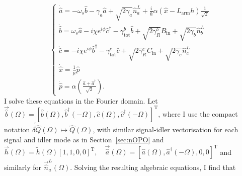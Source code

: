 \begin{equation}\label{eq:nIS_EoM}
\begin{cases}
\dot{\hat{a}}=-\omega_s\hat{b} - \gamma_a \hat{a} + \sqrt{2\gamma_a}\hat{n}^L_a+\frac{i}{\hbar}\alpha(\hat{x}-L_\mathrm{arm}h)\frac{1}{\sqrt{2}}\\
\dot{\hat{b}}=\omega_s\hat{a} - i\chi e^{i\phi}\hat{c}^\dagger - \gamma^b_\mathrm{tot} \hat{b} + \sqrt{2\gamma^b_R}\hat{B}_\mathrm{in} + \sqrt{2\gamma_b}\hat{n}^L_b\\
\dot{\hat{c}}=-i\chi e^{i\phi}\hat{b}^\dagger - \gamma^c_\mathrm{tot} \hat{c} + \sqrt{2\gamma^c_R}\hat{C}_\mathrm{in} + \sqrt{2\gamma_c}\hat{n}^L_c\\
\dot{\hat{x}}=\frac{1}{\mu}\hat{p}\\
\dot{\hat{p}}=\alpha\left(\frac{\hat{a}+\hat{a}^\dag}{\sqrt{2}}\right).
\end{cases}
\end{equation}
I solve these equations in the Fourier domain. Let $\vec{\hat b}(\Omega)=[\hat b(\Omega), \hat b^\dag(-\Omega), \hat c(\Omega), \hat c^\dag(-\Omega)]^\text{T}$, where I use the compact notation $\tilde{\delta\hat{Q}}(\Omega)\mapsto\hat{Q}(\Omega)$, with similar signal-idler vectorisation for each signal and idler mode as in Section~\ref{sec:nOPO} and $\vec h(\Omega)=\tilde h(\Omega) [1,1,0,0]^\text{T},\quad \vec{\hat a}(\Omega)=[\hat a(\Omega), \hat a^\dag(-\Omega),0,0]^\text{T}$ and similarly for $\vec{\hat n}^L_a(\Omega)$. Solving the resulting algebraic equations, I find that

